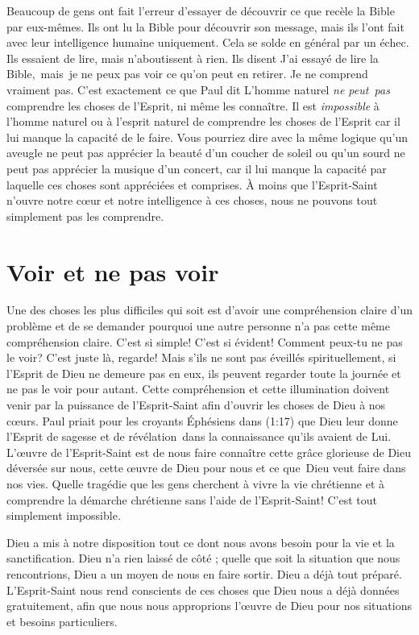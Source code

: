 Beaucoup de gens ont fait l'erreur d'essayer de découvrir ce que recèle
 la Bible par eux-mêmes. Ils ont lu la Bible pour découvrir son message,
 mais ils l'ont fait avec leur intelligence humaine uniquement.
 Cela se solde en général par un échec. Ils essaient de lire,
 mais n'aboutissent à rien. Ils disent\frcolon{}
 \Og J'ai essayé de lire la Bible,~mais~je ne peux pas voir ce qu'on peut
 en retirer. Je ne comprend vraiment pas. \Fg{}
 C'est exactement ce que Paul dit\frcolon{}
 \Og L'homme naturel \emph{ne peut~pas} comprendre les choses de l'Esprit,
 ni même les connaître. \Fg{}
 Il est \emph{impossible} à l'homme naturel ou à l'esprit naturel
 de comprendre les choses de l'Esprit car il lui manque la capacité
 de le faire. Vous pourriez dire avec la même logique qu'un aveugle
 ne peut pas apprécier la beauté d'un coucher de soleil ou qu'un sourd
 ne peut pas apprécier la musique d'un concert, car il lui manque la capacité
 par laquelle ces choses sont appréciées et comprises.
 À moins que l'Esprit-Saint n'ouvre notre cœur et notre intelligence à ces choses,
 nous ne pouvons tout simplement pas les comprendre.


\section{Voir et ne pas voir}

Une des choses les plus difficiles qui soit est d'avoir une compréhension
 claire d'un problème et de se demander pourquoi une autre personne
 n'a pas cette même compréhension claire. C'est si simple!
 C'est si évident! Comment peux-tu ne pas le voir?
 C'est juste là, regarde! Mais s'ils ne sont pas éveillés spirituellement,
 si l'Esprit de Dieu ne demeure pas en eux, ils peuvent regarder
 toute la journée et ne pas le voir pour autant.
 Cette compréhension et cette illumination doivent venir par la puissance
 de l'Esprit-Saint afin d'ouvrir les choses de Dieu à nos cœurs.
 Paul priait pour les croyants Éphésiens dans (1:17)
 que Dieu leur donne l'Esprit de sagesse et de révélation~dans la
 connaissance qu'ils avaient de Lui.
 L'œuvre de l'Esprit-Saint est de nous faire
 connaître cette grâce glorieuse de Dieu déversée sur nous,
 cette œuvre de Dieu pour nous et ce que~Dieu veut faire dans nos vies.
 Quelle tragédie que les gens cherchent à vivre la vie chrétienne
 et à comprendre la démarche chrétienne sans l'aide de l'Esprit-Saint!
 C'est tout simplement impossible.

Dieu a mis à notre disposition tout ce dont nous avons besoin pour la vie
 et la sanctification. Dieu n'a rien laissé de côté ; quelle que soit la situation
 que nous rencontrions, Dieu a un moyen de nous en faire sortir.
 Dieu a déjà tout préparé. L'Esprit-Saint nous rend conscients
 de ces choses que Dieu nous a déjà données gratuitement,
 afin que nous nous approprions l'œuvre de Dieu pour nos
 situations et besoins particuliers.

